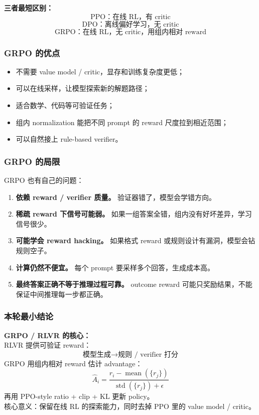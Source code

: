 \begin{summarybox}
\textbf{三者最短区别：}
\[
\text{PPO：在线 RL，有 critic}
\]
\[
\text{DPO：离线偏好学习，无 critic}
\]
\[
\text{GRPO：在线 RL，无 critic，用组内相对 reward}
\]
\end{summarybox}

\subsubsection{GRPO 的优点}

\begin{itemize}[leftmargin=1.5em]
  \item 不需要 value model / critic，显存和训练复杂度更低；
  \item 可以在线采样，让模型探索新的解题路径；
  \item 适合数学、代码等可验证任务；
  \item 组内 normalization 能把不同 prompt 的 reward 尺度拉到相近范围；
  \item 可以自然接上 rule-based verifier。
\end{itemize}

\subsubsection{GRPO 的局限}

GRPO 也有自己的问题：

\begin{enumerate}[leftmargin=1.5em]
  \item \textbf{依赖 reward / verifier 质量。} 验证器错了，模型会学错方向。
  \item \textbf{稀疏 reward 下信号可能弱。} 如果一组答案全错，组内没有好坏差异，学习信号很少。
  \item \textbf{可能学会 reward hacking。} 如果格式 reward 或规则设计有漏洞，模型会钻规则空子。
  \item \textbf{计算仍然不便宜。} 每个 prompt 要采样多个回答，生成成本高。
  \item \textbf{最终答案正确不等于推理过程可靠。} outcome reward 可能只奖励结果，不能保证中间推理每一步都正确。
\end{enumerate}

\subsubsection{本轮最小结论}

\begin{summarybox}
\textbf{GRPO / RLVR 的核心：}\\
RLVR 提供可验证 reward：
\[
\text{模型生成} \to \text{规则 / verifier 打分}
\]
GRPO 用组内相对 reward 估计 advantage：
\[
\hat{A}_i
=
\frac{r_i - \operatorname{mean}(\{r_j\})}{\operatorname{std}(\{r_j\})+\epsilon}
\]
再用 PPO-style ratio + clip + KL 更新 policy。\\
核心意义：保留在线 RL 的探索能力，同时去掉 PPO 里的 value model / critic。
\end{summarybox}

